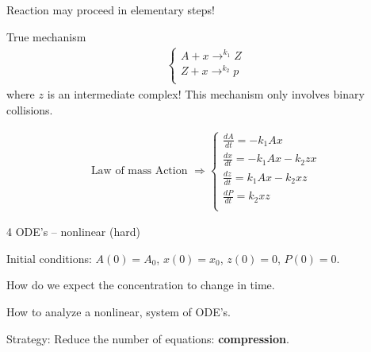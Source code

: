 \documentclass[
	date={October 14{,} 2024},
	month={10},
	day={14}
]{math486notes}
\begin{document}
\begin{center}
	Reaction may proceed in elementary steps!
\end{center}

True mechanism
\begin{equation*}
\begin{aligned}
	\left\{ \begin{array}{l}
		A + x \rightarrow^{k_{1}} Z\\
		Z + x \rightarrow^{k_{2}} p\\
	\end{array} \right.
\end{aligned}
\end{equation*}
where $z$ is an intermediate complex!
This mechanism only involves binary collisions.

\begin{equation*}
\begin{aligned}
	\mbox{Law of mass Action } \Rightarrow
	\left\{ \begin{array}{l}
		\frac{dA}{dt} = -k_{1}Ax\\
		\frac{dx}{dt} = -k_{1}Ax- k_{2}zx \\
		\frac{dz}{dt} = k_{1}Ax - k_{2}xz\\
		\frac{dP}{dt} = k_{2}xz\\
	\end{array} \right.
\end{aligned}
\end{equation*}

4 ODE's -- nonlinear (hard)

Initial conditions: $A(0)=A_{0}$, $x(0) = x_{0}$, $z(0) = 0$, $P(0) = 0$.

How do we expect the concentration to change in time.

How to analyze a nonlinear, system of ODE's.

Strategy: Reduce the number of equations: \textbf{compression}.
\end{document}
